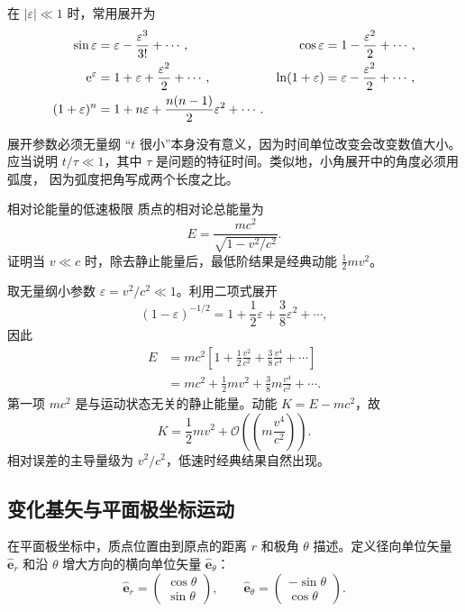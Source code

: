 \documentclass[UTF8,zihao=-4,oneside,openany]{ctexbook}
\numberwithin{equation}{section}
\newcommand{\e}{\mathrm e}
\newcommand{\vect}[1]{\bm{#1}}
\newcommand{\uvec}[1]{\hat{\vect{#1}}}
\newcommand{\order}[1]{\mathcal O\!\left(#1\right)}
\begin{document}
在 $|\varepsilon|\ll1$ 时，常用展开为
\begin{align}
  \sin\varepsilon&=\varepsilon-\frac{\varepsilon^3}{3!}+\cdots,
  &\cos\varepsilon&=1-\frac{\varepsilon^2}{2}+\cdots,\notag\\
  \e^\varepsilon&=1+\varepsilon+\frac{\varepsilon^2}{2}+\cdots,
  &\ln(1+\varepsilon)&=\varepsilon-\frac{\varepsilon^2}{2}+\cdots,\notag\\
  (1+\varepsilon)^n&=1+n\varepsilon+\frac{n(n-1)}2\varepsilon^2+\cdots.
  \label{eq:common-expansions}
\end{align}

\begin{warningbox}{展开参数必须无量纲}
“$t$ 很小”本身没有意义，因为时间单位改变会改变数值大小。应当说明
$t/\tau\ll1$，其中 $\tau$ 是问题的特征时间。类似地，小角展开中的角度必须用弧度，
因为弧度把角写成两个长度之比。
\end{warningbox}

\begin{examplebox}{相对论能量的低速极限}
质点的相对论总能量为
\[
  E=\frac{mc^2}{\sqrt{1-v^2/c^2}}.
\]
证明当 $v\ll c$ 时，除去静止能量后，最低阶结果是经典动能 $\frac12mv^2$。

\tcblower
取无量纲小参数 $\varepsilon=v^2/c^2\ll1$。利用二项式展开
\[
  (1-\varepsilon)^{-1/2}
  =1+\frac12\varepsilon+\frac38\varepsilon^2+\cdots,
\]
因此
\begin{align*}
  E
  &=mc^2\left[1+\frac12\frac{v^2}{c^2}
  +\frac38\frac{v^4}{c^4}+\cdots\right]\\
  &=mc^2+\frac12mv^2+\frac38m\frac{v^4}{c^2}+\cdots.
\end{align*}
第一项 $mc^2$ 是与运动状态无关的静止能量。动能 $K=E-mc^2$，故
\[
  K=\frac12mv^2+\order{\left(m\frac{v^4}{c^2}\right)}.
\]
相对误差的主导量级为 $v^2/c^2$，低速时经典结果自然出现。
\end{examplebox}

\subsection{变化基矢与平面极坐标运动}

在平面极坐标中，质点位置由到原点的距离 $r$ 和极角 $\theta$ 描述。定义径向单位矢量
$\uvec e_r$ 和沿 $\theta$ 增大方向的横向单位矢量 $\uvec e_\theta$：
\[
  \uvec e_r=
  \begin{pmatrix}\cos\theta\\ \sin\theta\end{pmatrix},
  \qquad
  \uvec e_\theta=
  \begin{pmatrix}-\sin\theta\\ \cos\theta\end{pmatrix}.
\]
\end{document}
